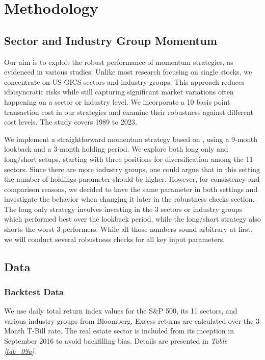\documentclass[a4paper,12pt,twoside]{article}
\begin{document}
\newpage
\section{Methodology}
\subsection{Sector and Industry Group Momentum}
Our aim is to exploit the robust performance of momentum strategies, as evidenced in various studies. Unlike most research focusing on single stocks, we concentrate on US GICS sectors and industry groups. This approach reduces idiosyncratic risks while still capturing significant market variations often happening on a sector or industry level. We incorporate a 10 basis point transaction cost in our strategies and examine their robustness against different cost levels. The study covers 1989 to 2023.

We implement a straightforward momentum strategy based on \cite{jegadeesh1993returns}, using a 9-month lookback and a 3-month holding period. We explore both long only and long/short setups, starting with three positions for diversification among the 11 sectors. Since there are more industry groups, one could argue that in this setting the number of holdings parameter should be higher. However, for consistency and comparison reasons, we decided to have the same parameter in both settings and investigate the behavior when changing it later in the robustness checks section. The long only strategy involves investing in the 3 sectors or industry groups which performed best over the lookback period, while the long/short strategy also shorts the worst 3 performers. While all those numbers sound arbitrary at first, we will conduct several robustness checks for all key input parameters.


\subsection{Data}
\subsubsection{Backtest Data}
We use daily total return index values for the S\&P 500, its 11 sectors, and various industry groups from Bloomberg. Excess returns are calculated over the 3 Month T-Bill rate. The real estate sector is included from its inception in September 2016 to avoid backfilling bias. Details are presented in \textit{Table \ref{tab_09a}}.
\end{document}
